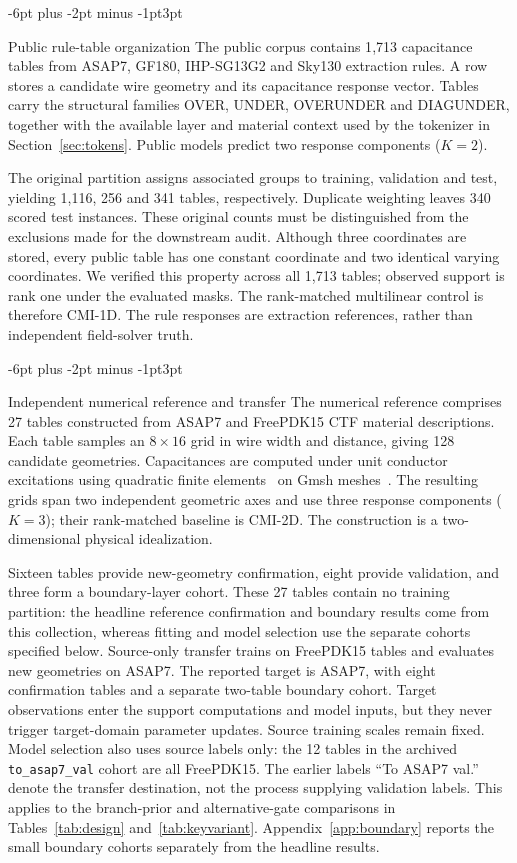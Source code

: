 \documentclass{article}
\makeatletter
\renewcommand{\subsection}{\@startsection{subsection}{2}{\z@}
  {-6pt plus -2pt minus -1pt}{3pt}{\normalsize\sc\raggedright}}
\makeatother
\begin{document}
\subsection{Public rule-table organization}
The public corpus contains 1{,}713 capacitance tables from ASAP7, GF180,
IHP-SG13G2 and Sky130 extraction rules. A row stores a candidate wire geometry
and its capacitance response vector. Tables carry the structural families
OVER, UNDER, OVERUNDER and DIAGUNDER, together with the available layer and
material context used by the tokenizer in Section~\ref{sec:tokens}.
Public models predict two response components ($K=2$).

The original partition assigns associated groups to training, validation and
test, yielding 1{,}116, 256 and 341 tables, respectively. Duplicate weighting
leaves 340 scored test instances. These original counts must be distinguished
from the exclusions made for the downstream audit. Although three coordinates
are stored, every public table has one constant coordinate and two identical
varying coordinates. We verified this property across all 1{,}713 tables;
observed support is rank one under the evaluated masks. The rank-matched
multilinear control is therefore CMI-1D. The rule responses are extraction
references, rather than independent field-solver truth.

\subsection{Independent numerical reference and transfer}
The numerical reference comprises 27 tables constructed from ASAP7 and FreePDK15
CTF material descriptions. Each table samples an $8\times16$ grid in wire width
and distance, giving 128 candidate geometries. Capacitances are computed under
unit conductor excitations using quadratic finite elements~\citep{skfem} on
Gmsh meshes~\citep{gmsh}. The resulting grids span two independent geometric
axes and use three response components ($K=3$); their rank-matched baseline is
CMI-2D. The construction is a two-dimensional physical idealization.

Sixteen tables provide new-geometry confirmation, eight provide validation,
and three form a boundary-layer cohort. These 27 tables contain no training partition: the headline reference
confirmation and boundary results come from this collection, whereas fitting
and model selection use the separate cohorts specified below. Source-only
transfer trains on FreePDK15 tables and evaluates new geometries on ASAP7. The reported
target is ASAP7, with eight confirmation tables and a separate two-table
boundary cohort. Target observations enter the support computations and model
inputs, but they never trigger target-domain parameter updates. Source training
scales remain fixed. Model selection also uses source labels only: the
12 tables in the archived \texttt{to\_asap7\_val} cohort are all FreePDK15.
The earlier labels ``To ASAP7 val.'' denote the transfer destination, not the
process supplying validation labels. This applies to the branch-prior and
alternative-gate comparisons in Tables~\ref{tab:design} and~\ref{tab:keyvariant}.
Appendix~\ref{app:boundary} reports the small boundary cohorts separately from
the headline results.
\end{document}
